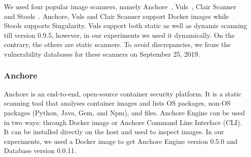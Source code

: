 \documentclass[a4paper,num-refs]{oup-contemporary}
\begin{document}


We used four popular image scanners, namely Anchore~\cite{github_2019},
Vuls~\cite{future-architect_2019}, Clair Scanner~\cite{arminc_2019} and
Stools~\cite{stools}. Anchore, Vuls and Clair Scanner support Docker
images while Stools supports Singularity. Vuls support both static as well as dynamic
scanning till version 0.9.5, however, in our experiments we used it dynamically.
On the contrary, the others
are static scanners. To avoid discrepancies, we froze the vulnerability
databases for these scanners on September 25, 2019.

\subsubsection{Anchore}

Anchore is an end-to-end, open-source container security platform. It
is a static
scanning tool that analyses container images and lists OS
packages, non-OS packages (Python, Java, Gem, and Npm), and files.
Anchore Engine can be used in two ways: through Docker image or Anchore
Command Line Interface (CLI).
It can be
installed directly on the host and used to inspect images.
In our experiments, we used a Docker image to get Anchore Engine version 0.5.0 and Database
version 0.0.11.
\end{document}
